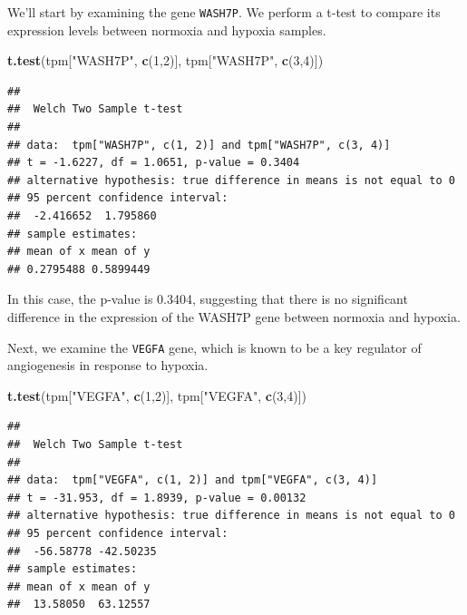 \documentclass[
]{book}
\newenvironment{Shaded}{\begin{snugshade}}{\end{snugshade}}
\newcommand{\DecValTok}[1]{\textcolor[rgb]{0.00,0.00,0.81}{#1}}
\newcommand{\FunctionTok}[1]{\textcolor[rgb]{0.13,0.29,0.53}{\textbf{#1}}}
\newcommand{\NormalTok}[1]{#1}
\newcommand{\StringTok}[1]{\textcolor[rgb]{0.31,0.60,0.02}{#1}}
\begin{document}
We'll start by examining the gene \texttt{WASH7P}. We perform a t-test to compare its expression levels between normoxia and hypoxia samples.

\begin{Shaded}
\begin{Highlighting}[]
\FunctionTok{t.test}\NormalTok{(tpm[}\StringTok{"WASH7P"}\NormalTok{, }\FunctionTok{c}\NormalTok{(}\DecValTok{1}\NormalTok{,}\DecValTok{2}\NormalTok{)], tpm[}\StringTok{"WASH7P"}\NormalTok{, }\FunctionTok{c}\NormalTok{(}\DecValTok{3}\NormalTok{,}\DecValTok{4}\NormalTok{)])}
\end{Highlighting}
\end{Shaded}

\begin{verbatim}
## 
##  Welch Two Sample t-test
## 
## data:  tpm["WASH7P", c(1, 2)] and tpm["WASH7P", c(3, 4)]
## t = -1.6227, df = 1.0651, p-value = 0.3404
## alternative hypothesis: true difference in means is not equal to 0
## 95 percent confidence interval:
##  -2.416652  1.795860
## sample estimates:
## mean of x mean of y 
## 0.2795488 0.5899449
\end{verbatim}

In this case, the p-value is 0.3404, suggesting that there is no significant difference in the expression of the WASH7P gene between normoxia and hypoxia.

Next, we examine the \texttt{VEGFA} gene, which is known to be a key regulator of angiogenesis in response to hypoxia.

\begin{Shaded}
\begin{Highlighting}[]
\FunctionTok{t.test}\NormalTok{(tpm[}\StringTok{"VEGFA"}\NormalTok{, }\FunctionTok{c}\NormalTok{(}\DecValTok{1}\NormalTok{,}\DecValTok{2}\NormalTok{)], tpm[}\StringTok{"VEGFA"}\NormalTok{, }\FunctionTok{c}\NormalTok{(}\DecValTok{3}\NormalTok{,}\DecValTok{4}\NormalTok{)])}
\end{Highlighting}
\end{Shaded}

\begin{verbatim}
## 
##  Welch Two Sample t-test
## 
## data:  tpm["VEGFA", c(1, 2)] and tpm["VEGFA", c(3, 4)]
## t = -31.953, df = 1.8939, p-value = 0.00132
## alternative hypothesis: true difference in means is not equal to 0
## 95 percent confidence interval:
##  -56.58778 -42.50235
## sample estimates:
## mean of x mean of y 
##  13.58050  63.12557
\end{verbatim}
\end{document}
